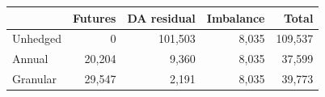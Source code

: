 {\small
\begin{tabular}{lrrrr}
\toprule
 & Futures & DA residual & Imbalance & Total \\
\midrule
Unhedged & 0 & 101,503 & 8,035 & 109,537 \\
Annual & 20,204 & 9,360 & 8,035 & 37,599 \\
Granular & 29,547 & 2,191 & 8,035 & 39,773 \\
\bottomrule
\end{tabular}
}
